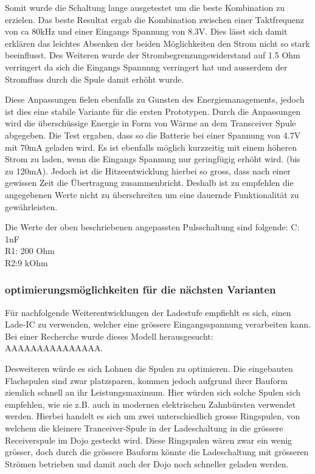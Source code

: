 Somit wurde die Schaltung lange ausgetestet um die beste Kombination zu erzielen. Das beste Resultat ergab die Kombination zwischen einer Taktfrequenz von ca 80kHz und einer Eingangs Spannung von 8.3V. Dies lässt sich damit erklären das leichtes Absenken der beiden Möglichkeiten den Strom nicht so stark beeinflusst. Des Weiteren wurde der Strombegrenzungswiderstand auf 1.5 Ohm verringert da sich die Eingangs Spannung verringert hat und ausserdem der Stromfluss durch die Spule damit erhöht wurde. 

Diese Anpassungen fielen ebenfalls zu Gunsten des Energiemanagements, jedoch ist dies eine stabile Variante für die ersten Prototypen. Durch die Anpassungen wird die überschüssige Energie in Form von Wärme an dem Transceiver Spule abgegeben. Die Test ergaben, dass so die Batterie bei einer Spannung von 4.7V mit 70mA geladen wird. Es ist ebenfalls möglich kurzzeitig mit einem höheren Strom zu laden, wenn die Eingangs Spannung nur geringfügig erhöht wird. (bis zu 120mA). Jedoch ist die Hitzeentwicklung hierbei so gross, dass nach einer gewissen Zeit die Übertragung zusammenbricht. Deshalb ist zu empfehlen die angegebenen Werte nicht zu überschreiten um eine dauernde Funktionalität zu gewährleisten.

Die Werte der oben beschriebenen angepassten Pulsschaltung sind folgende:
C: 1nF\\
R1: 200 Ohm\\
R2:9 kOhm\\

\subsubsection*{optimierungsmöglichkeiten für die nächsten Varianten}\label{sec:energieuebertragung}
Für nachfolgende Weiterentwicklungen der Ladestufe empfiehlt es sich, einen Lade-IC zu verwenden, welcher eine grössere Eingangsspannung verarbeiten kann. Bei einer Recherche wurde dieses Modell herausgesucht: AAAAAAAAAAAAAAA.

Desweiteren würde es sich Lohnen die Spulen zu optimieren. Die eingebauten Flachspulen sind zwar platzsparen, kommen jedoch aufgrund ihrer Bauform ziemlich schnell an ihr Leistungsmaximum. Hier würden sich solche Spulen sich empfehlen, wie sie z.B. auch in modernen elektrischen Zahnbürsten verwendet werden. Hierbei handelt es sich um zwei unterschiedlich grosse Ringspulen, von welchem die kleinere Tranceiver-Spule in der Ladeschaltung in die grössere Receiverspule  im Dojo gesteckt wird. Diese Ringspulen wären zwar ein wenig grösser, doch durch die grössere Bauform könnte die Ladeschaltung mit grösseren Strömen betrieben und damit auch der Dojo noch schneller geladen werden.